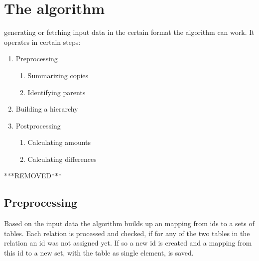 \documentclass[10pt, journal, twocolumn]{IEEEtran}
\begin{document}
\section{The algorithm}
 generating or fetching input data in the certain format the algorithm can work. It operates in certain steps: \begin{enumerate}
\item Preprocessing
\begin{enumerate}
\item Summarizing copies
\item Identifying parents
\end{enumerate}
\item Building a hierarchy
\item Postprocessing
\begin{enumerate}
\item Calculating amounts 
\item Calculating differences
\end{enumerate}
\end{enumerate}
***REMOVED***
\subsection{Preprocessing}
Based on the input data the algorithm builds up an mapping from ids to a sets of tables. Each relation is processed and checked, if for any of the two tables in the relation an id was not assigned yet. If so a new id is created and a mapping from this id to a new set, with the table as single element, is saved. \\
\end{document}
